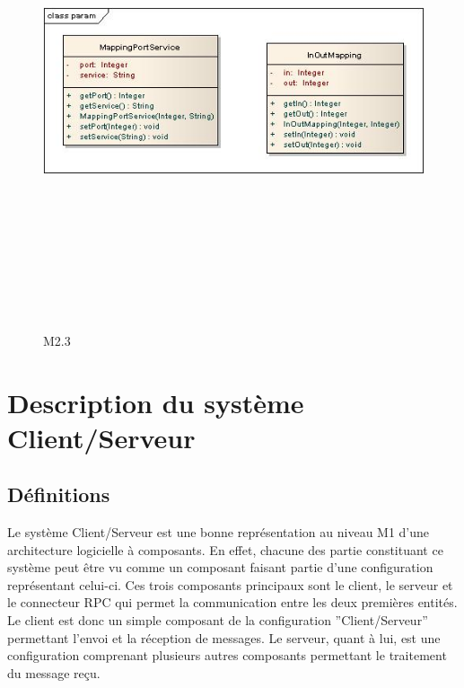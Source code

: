 \documentclass[11pt,a4paper]{article}
\begin{document}
\begin{figure}[h]
  		\centering
  		\includegraphics[height=14cm,width=15cm]{param.jpg}
  		\caption{M2.3}
  		\label{Représentation des liens}
\end{figure}



\clearpage
\section{Description du système Client/Serveur}
\subsection{Définitions}
Le système Client/Serveur est une bonne représentation au niveau M1 d'une
architecture logicielle à composants. En effet, chacune des partie constituant
ce système peut être vu comme un composant faisant partie d'une configuration
représentant celui-ci. Ces trois composants principaux sont le client, le
serveur et le connecteur RPC qui permet la communication entre les deux
premières entités.\\

Le client est donc un simple composant de la configuration ''Client/Serveur''
permettant l'envoi et la réception de messages. Le serveur, quant à lui, est
une configuration comprenant plusieurs autres composants permettant le
traitement du message reçu.
\end{document}
